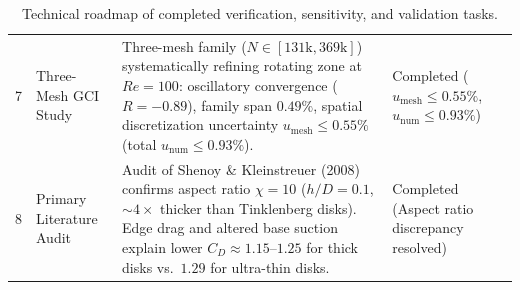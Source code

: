 \documentclass[11pt,a4paper]{article}
\begin{document}
\begin{table}[H]
\begin{tabularx}{\textwidth}{c >{\raggedright\arraybackslash}p{42mm} >{\raggedright\arraybackslash}X >{\centering\arraybackslash}p{32mm}}
7 & Three-Mesh GCI Study & Three-mesh family ($N \in [131\text{k}, 369\text{k}]$) systematically refining rotating zone at $Re = 100$: oscillatory convergence ($R = -0.89$), family span $0.49\%$, spatial discretization uncertainty $u_{\mathrm{mesh}} \le 0.55\%$ (total $u_{\mathrm{num}} \le 0.93\%$). & Completed \newline ($u_{\mathrm{mesh}} \le 0.55\%$, $u_{\mathrm{num}} \le 0.93\%$) \\
8 & Primary Literature Audit & Audit of Shenoy \& Kleinstreuer (2008) confirms aspect ratio $\chi = 10$ ($h/D = 0.1$, $\sim 4\times$ thicker than Tinklenberg disks). Edge drag and altered base suction explain lower $C_D \approx 1.15\text{--}1.25$ for thick disks vs.\ $1.29$ for ultra-thin disks. & Completed \newline (Aspect ratio discrepancy resolved) \\
\bottomrule
\end{tabularx}
\caption{Technical roadmap of completed verification, sensitivity, and validation tasks.}
\label{tab:roadmap}
\end{table}
\end{document}
